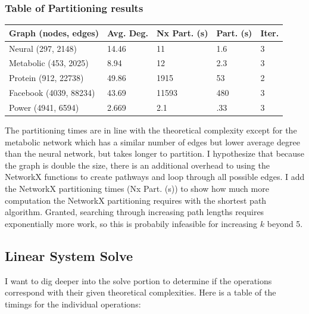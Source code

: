 \documentclass{article}
\begin{document}
\subsubsection{Table of Partitioning results} 
\begin{center}
\renewcommand{\arraystretch}{1.5}
    \begin{tabular}{| l | l | l | l | l |}
    \hline
    Graph (nodes, edges) & Avg. Deg. & Nx Part. (s) & Part. (s) & Iter. \\ \hline
    Neural (297, 2148) & 14.46 & 11 & 1.6 & 3 \\ \hline
    Metabolic (453, 2025) & 8.94 & 12 & 2.3 & 3 \\  \hline
    Protein (912, 22738) & 49.86 & 1915 & 53 & 2 \\ \hline
    Facebook (4039, 88234) & 43.69 & 11593 & 480 & 3 \\ \hline
    Power (4941, 6594) & 2.669 & 2.1 & .33 & 3 \\ 
    \hline
    \end{tabular}
\end{center}

The partitioning times are in line with the theoretical complexity except for the metabolic network which has a similar number of edges but lower average degree than the neural network, but takes longer to partition. I hypothesize that because the graph is double the size, there is an additional overhead to using the NetworkX functions to create pathways and loop through all possible edges. I add the NetworkX partitioning times (Nx Part. (s)) to show how much more computation the NetworkX partitioning requires with the shortest path algorithm. Granted, searching through increasing path lengths requires exponentially more work, so this is probabily infeasible for increasing $k$ beyond 5.

\subsection{Linear System Solve}
I want to dig deeper into the solve portion to determine if the operations correspond with their given theoretical complexities. Here is a table of the timings for the individual operations:\\
\end{document}
